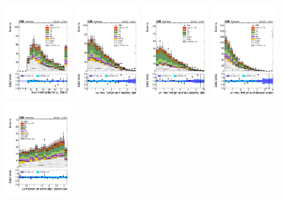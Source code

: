 \begin{figure} [!h]
  \centering
  \includegraphics[width=0.22\textwidth]{figures/signalregion_2lss/emu/Lep2Pt.pdf}
  \includegraphics[width=0.22\textwidth]{figures/signalregion_2lss/emu/dEtaFwdJetBJet_40.pdf}
  \includegraphics[width=0.22\textwidth]{figures/signalregion_2lss/emu/dEtaFwdJet2BJet_40.pdf}
  \includegraphics[width=0.22\textwidth]{figures/signalregion_2lss/emu/dEtaFwdJetClosestLep_40.pdf} \\
  \includegraphics[width=0.22\textwidth]{figures/signalregion_2lss/emu/dPhiHighestPtSSPair.pdf}

\end{figure}

